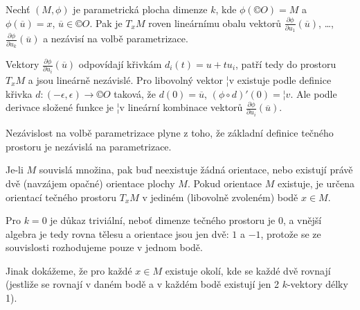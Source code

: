 \documentclass[12pt]{article}                   %
\begin{document}
        \begin{veta}
            Nechť $(M, \phi)$ je parametrická plocha dimenze $k$, kde $\phi(©O) = M$ a $\phi(\overline{u}) = x$, $\overline{u} \in ©O$. Pak je $T_xM$ roven lineárnímu obalu vektorů $\frac{\partial\phi}{\partial u_1}(\overline{u})$, …, $\frac{\partial\phi}{\partial u_k}(\overline{u})$ a nezávisí na volbě parametrizace.

            \begin{dukazin}
                Vektory $\frac{\partial \phi}{\partial u_i}(\overline{u})$ odpovídají křivkám $d_i(t) = u + tu_i$, patří tedy do prostoru $T_xM$ a jsou lineárně nezávislé. Pro libovolný vektor ¦v existuje podle definice křivka $d: (-\epsilon, \epsilon) \rightarrow ©O$ taková, že $d(0) = \overline{u}$, $(\phi \circ d)'(0) = ¦v$. Ale podle derivace složené funkce je ¦v lineární kombinace vektorů $\frac{\partial \phi}{\partial u_i}(\overline{u})$.

                Nezávislost na volbě parametrizace plyne z toho, že základní definice tečného prostoru je nezávislá na parametrizace.
            \end{dukazin}
        \end{veta}

        \begin{lemma}
            Je-li $M$ souvislá množina, pak buď neexistuje žádná orientace, nebo existují právě dvě (navzájem opačné) orientace plochy $M$. Pokud orientace $M$ existuje, je určena orientací tečného prostoru $T_xM$ v jediném (libovolně zvoleném) bodě $x \in M$.

            \begin{dukazin}
                Pro $k=0$ je důkaz triviální, neboť dimenze tečného prostoru je $0$, a vnější algebra je tedy rovna tělesu a orientace jsou jen dvě: $1$ a $-1$, protože se ze souvislosti rozhodujeme pouze v jednom bodě.

                Jinak dokážeme, že pro každé $x \in M$ existuje okolí, kde se každé dvě rovnají (jestliže se rovnají v daném bodě a v každém bodě existují jen 2 $k$-vektory délky 1).
            \end{dukazin}
        \end{lemma}
\end{document}

